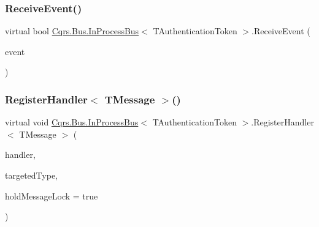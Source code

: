 \mbox{\label{classCqrs_1_1Bus_1_1InProcessBus_aab52f8518371f5ff5e3f193b1234f192_aab52f8518371f5ff5e3f193b1234f192}} 
\subsubsection{\texorpdfstring{Receive\+Event()}{ReceiveEvent()}}
{\footnotesize\ttfamily virtual bool \hyperlink{classCqrs_1_1Bus_1_1InProcessBus}{Cqrs.\+Bus.\+In\+Process\+Bus}$<$ T\+Authentication\+Token $>$.Receive\+Event (\begin{DoxyParamCaption}\item[{\hyperlink{interfaceCqrs_1_1Events_1_1IEvent}{I\+Event}$<$ T\+Authentication\+Token $>$ @}]{event }\end{DoxyParamCaption})\hspace{0.3cm}{\ttfamily [virtual]}}

\mbox{\label{classCqrs_1_1Bus_1_1InProcessBus_aa14a00defdf2d48b2d0e6a65dbdb12d9_aa14a00defdf2d48b2d0e6a65dbdb12d9}} 
\subsubsection{\texorpdfstring{Register\+Handler$<$ T\+Message $>$()}{RegisterHandler< TMessage >()}\hspace{0.1cm}{\footnotesize\ttfamily [1/2]}}
{\footnotesize\ttfamily virtual void \hyperlink{classCqrs_1_1Bus_1_1InProcessBus}{Cqrs.\+Bus.\+In\+Process\+Bus}$<$ T\+Authentication\+Token $>$.Register\+Handler$<$ T\+Message $>$ (\begin{DoxyParamCaption}\item[{Action$<$ T\+Message $>$}]{handler,  }\item[{Type}]{targeted\+Type,  }\item[{bool}]{hold\+Message\+Lock = {\ttfamily true} }\end{DoxyParamCaption})\hspace{0.3cm}{\ttfamily [virtual]}}



